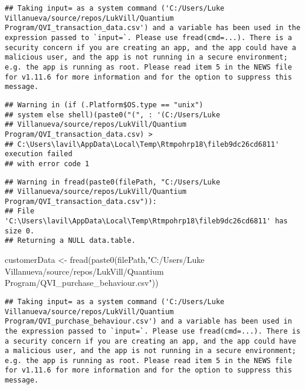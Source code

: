 \documentclass[
]{article}
\newenvironment{Shaded}{\begin{snugshade}}{\end{snugshade}}
\newcommand{\FunctionTok}[1]{\textcolor[rgb]{0.00,0.00,0.00}{#1}}
\newcommand{\NormalTok}[1]{#1}
\newcommand{\OtherTok}[1]{\textcolor[rgb]{0.56,0.35,0.01}{#1}}
\newcommand{\StringTok}[1]{\textcolor[rgb]{0.31,0.60,0.02}{#1}}
\begin{document}
\begin{verbatim}
## Taking input= as a system command ('C:/Users/Luke Villanueva/source/repos/LukVill/Quantium Program/QVI_transaction_data.csv') and a variable has been used in the expression passed to `input=`. Please use fread(cmd=...). There is a security concern if you are creating an app, and the app could have a malicious user, and the app is not running in a secure environment; e.g. the app is running as root. Please read item 5 in the NEWS file for v1.11.6 for more information and for the option to suppress this message.
\end{verbatim}

\begin{verbatim}
## Warning in (if (.Platform$OS.type == "unix")
## system else shell)(paste0("(", : '(C:/Users/Luke
## Villanueva/source/repos/LukVill/Quantium Program/QVI_transaction_data.csv) >
## C:\Users\lavil\AppData\Local\Temp\Rtmpohrp18\fileb9dc26cd6811' execution failed
## with error code 1
\end{verbatim}

\begin{verbatim}
## Warning in fread(paste0(filePath, "C:/Users/Luke
## Villanueva/source/repos/LukVill/Quantium Program/QVI_transaction_data.csv")):
## File 'C:\Users\lavil\AppData\Local\Temp\Rtmpohrp18\fileb9dc26cd6811' has size 0.
## Returning a NULL data.table.
\end{verbatim}

\begin{Shaded}
\begin{Highlighting}[]
\NormalTok{customerData }\OtherTok{\textless{}{-}} \FunctionTok{fread}\NormalTok{(}\FunctionTok{paste0}\NormalTok{(filePath,}\StringTok{"C:/Users/Luke Villanueva/source/repos/LukVill/Quantium Program/QVI\_purchase\_behaviour.csv"}\NormalTok{))}
\end{Highlighting}
\end{Shaded}

\begin{verbatim}
## Taking input= as a system command ('C:/Users/Luke Villanueva/source/repos/LukVill/Quantium Program/QVI_purchase_behaviour.csv') and a variable has been used in the expression passed to `input=`. Please use fread(cmd=...). There is a security concern if you are creating an app, and the app could have a malicious user, and the app is not running in a secure environment; e.g. the app is running as root. Please read item 5 in the NEWS file for v1.11.6 for more information and for the option to suppress this message.
\end{verbatim}
\end{document}
